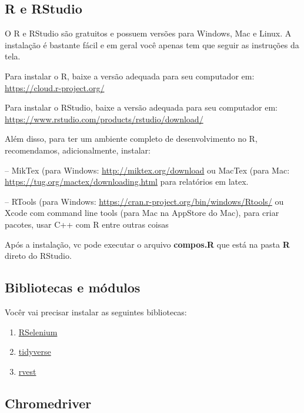 \documentclass[
]{book}
\providecommand{\tightlist}{%
  \setlength{\itemsep}{0pt}\setlength{\parskip}{0pt}}
\begin{document}
\hypertarget{r-e-rstudio}{%
\subsection{R e RStudio}\label{r-e-rstudio}}

O R e RStudio são gratuitos e possuem versões para Windows, Mac e Linux. A instalação é bastante fácil e em geral você apenas tem que seguir as instruções da tela.

Para instalar o R, baixe a versão adequada para seu computador em: \url{https://cloud.r-project.org/}

Para instalar o RStudio, baixe a versão adequada para seu computador em: \url{https://www.rstudio.com/products/rstudio/download/}

Além disso, para ter um ambiente completo de desenvolvimento no R, recomendamos, adicionalmente, instalar:

-- MikTex (para Windows: \url{http://miktex.org/download} ou MacTex (para Mac: \url{https://tug.org/mactex/downloading.html} para relatórios em latex.

-- RTools (para Windows: \url{https://cran.r-project.org/bin/windows/Rtools/} ou Xcode com command line tools (para Mac na AppStore do Mac), para criar pacotes, usar C++ com R entre outras coisas

Após a instalação, vc pode executar o arquivo \textbf{compos.R} que está na pasta \textbf{R} direto do RStudio.

\hypertarget{bibliotecas-e-muxf3dulos}{%
\subsection{Bibliotecas e módulos}\label{bibliotecas-e-muxf3dulos}}

Vocêr vai precisar instalar as seguintes bibliotecas:

\begin{enumerate}
\def\labelenumi{\arabic{enumi}.}
\tightlist
\item
  \href{https://cran.r-project.org/web/packages/RSelenium/RSelenium.pdf}{RSelenium}
\item
  \href{https://www.tidyverse.org/}{tidyverse}
\item
  \href{https://cran.r-project.org/web/packages/rvest/rvest.pdf}{rvest}
\end{enumerate}

\hypertarget{chromedriver}{%
\subsection{Chromedriver}\label{chromedriver}}
\end{document}
